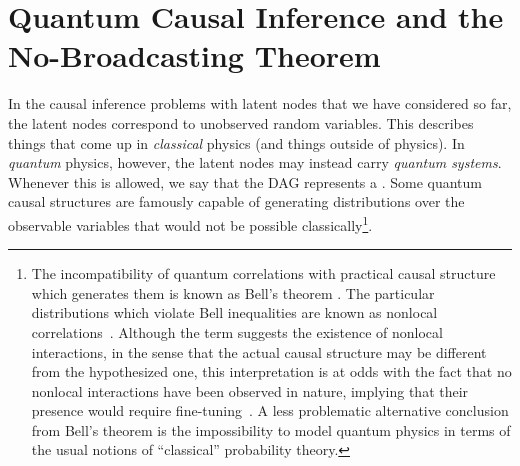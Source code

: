 

\section{Quantum Causal Inference and the No-Broadcasting Theorem}\label{sec:classicallity}

In the causal inference problems with latent nodes that we have considered so far, the latent nodes correspond to unobserved random variables. This describes things that come up in \emph{classical} physics (and things outside of physics). In \emph{quantum} physics, however, the latent nodes may instead carry \emph{quantum systems}. Whenever this is allowed, we say that the DAG represents a . Some quantum causal structures are famously capable of generating distributions over the observable variables that would not be possible classically\footnote{The incompatibility of quantum correlations with practical causal structure which generates them is known as Bell's theorem \cite{bell1966lhvm}. The particular distributions which violate Bell inequalities are known as nonlocal correlations~\cite{Brunner2013Bell}. Although the term suggests the existence of nonlocal interactions, in the sense that the actual causal structure may be different from the hypothesized one, this interpretation is at odds with the fact that no nonlocal interactions have been observed in nature, implying that their presence would require fine-tuning~\cite{WoodSpekkens}. A less problematic alternative conclusion from Bell's theorem is the impossibility to model quantum physics in terms of the usual notions of ``classical'' probability theory.}.

